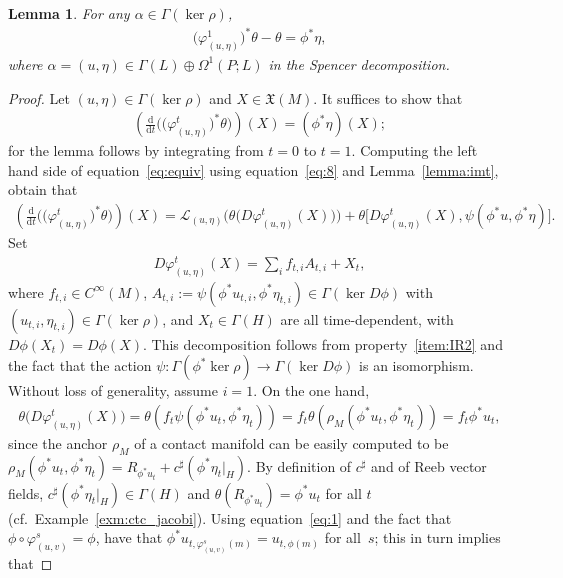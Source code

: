 \documentclass[pdftex]{sigma}
\numberwithin{equation}{section}
\newtheorem{Lemma}[Theorem]{Lemma}
\newcommand{\X}{\ensuremath{\mathfrak{X}}}
\newcommand{\de}{\mathrm{d}} %
\begin{document}
\begin{Lemma}\label{lemma:fundamental}
 For any $\alpha \in \Gamma(\ker \rho)$,
 \begin{gather*}
 \big(\varphi^1_{(u,\eta)}\big)^*\theta - \theta = \phi^*\eta,
 \end{gather*}
where $\alpha = (u, \eta) \in \Gamma(L) \oplus \Omega^1(P;L)$ in the Spencer decomposition.
\end{Lemma}

\begin{proof}
Let $(u,\eta) \in \Gamma(\ker \rho)$ and $X\in\X(M)$. It suf\/f\/ices to show that
 \begin{gather}\label{eq:equiv}
 \left( \frac{\de}{\de t} \big(\big(\varphi^t_{(u,\eta)}\big)^* \theta\big)\right)(X) = (\phi^*\eta)(X);
 \end{gather}
for the lemma follows by integrating from $t=0$ to $t=1$. Computing the left hand side of equation~\eqref{eq:equiv} using equation~\eqref{eq:8} and Lemma~\ref{lemma:imt}, obtain that
 \begin{gather} \label{eq:9}
 \left(\frac{\de}{\de t} \big(\big(\varphi^t_{(u,\eta)}\big)^* \theta\big)\right)(X)=
 \mathcal{L}_{(u,\eta)}\big(\theta\big(D \varphi^t_{(u,\eta)}(X)\big)\big) + \theta\big[D \varphi^t_{(u,\eta)}(X),\psi(\phi^* u, \phi^*\eta)\big].
 \end{gather}
Set
 \begin{gather}\label{eq:11} D\varphi^t_{(u,\eta)}(X) = \sum\limits_i f_{t,i} A_{t,i} + X_t, \end{gather}
where $f_{t,i} \in C^{\infty}(M)$, $A_{t,i} := \psi(\phi^*u_{t,i},\phi^*\eta_{t,i}) \in \Gamma(\ker D\phi)$ with $(u_{t,i},\eta_{t,i})\in\Gamma(\ker\rho)$, and $X_t \in \Gamma(H)$ are all time-dependent, with $D\phi(X_t) = D\phi(X)$. This decomposition follows from property~\ref{item:IR2} and the fact that the action $\psi \colon \Gamma(\phi^* \ker \rho) \to \Gamma(\ker D\phi)$ is an isomorphism. Without loss of generality, assume $i=1$. On the one hand,
 \begin{gather}\label{eq:1}
 \theta\big(D\varphi^t_{(u,\eta)}(X)\big) = \theta ( f_{t}\psi(\phi^*u_{t},\phi^* \eta_{t})) =f_t\theta(\rho_M(\phi^*u_{t}, \phi^* \eta_{t}))=
 f_{t} \phi^*u_{t},
 \end{gather}
since the anchor $\rho_M$ of a contact manifold can be easily computed to be $ \rho_M(\phi^*u_{t}, \phi^* \eta_{t}) = R_{\phi^*u_{t}} + c^{\sharp}(\phi^* \eta_{t}\rvert_H)$. By def\/inition of $c^{\sharp}$ and of Reeb vector f\/ields, $c^{\sharp}( \phi^* \eta_{t}\rvert_H) \in \Gamma(H)$ and $\theta(R_{\phi^*u_{t}})=\phi^*u_{t}$ for all $t$ (cf.\ Example~\ref{exm:ctc_jacobi}). Using equation~\eqref{eq:1} and the fact that $\phi\circ\varphi^s_{(u,v)}=\phi$, have that $\phi^*u_{t,\varphi^s_{(u,v)}(m)}=u_{t,\phi(m)}$ for all~$s$; this in turn implies that

\end{proof}
\end{document}

